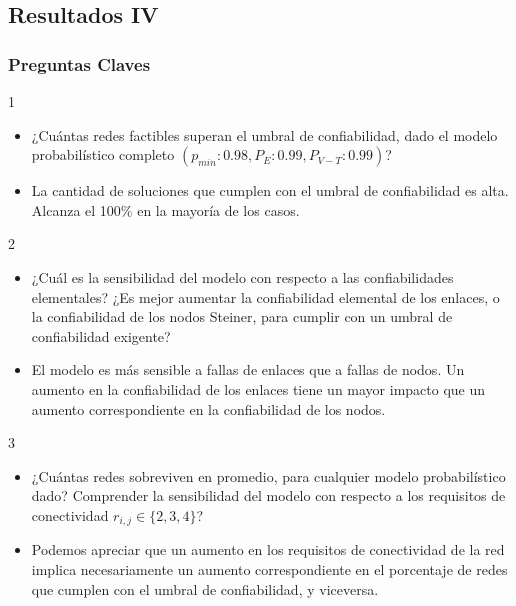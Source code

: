 \subsection{Resultados IV}
\begin{frame} \frametitle{Preguntas Claves}
\begin{tiny}
\begin{block} {1}
 	 \begin{itemize}
 	 	\item ¿Cuántas redes factibles superan el umbral de confiabilidad, dado el modelo probabilístico completo $(p_{min}:0.98,P_E:0.99,P_{V-T}:0.99)$?
 	 	\item La cantidad de soluciones que cumplen con el umbral de confiabilidad es alta. Alcanza el 100\% en la mayoría de los casos.
 	 \end{itemize}  
 \end{block} 	   
 \begin{block} {2}
 	 \begin{itemize}
 	 	\item ¿Cuál es la sensibilidad del modelo con respecto a las confiabilidades elementales? ¿Es mejor aumentar la confiabilidad elemental de los enlaces, o la confiabilidad de los nodos Steiner, para cumplir con un umbral de confiabilidad exigente?
 	 	\item El modelo es más sensible a fallas de enlaces que a fallas de nodos. Un aumento en la confiabilidad de los enlaces tiene un mayor impacto que un aumento correspondiente en la confiabilidad de los nodos.
 	 \end{itemize}  
 \end{block} 	
  \begin{block} {3}
 	 \begin{itemize}
 	 	\item ¿Cuántas redes sobreviven en promedio, para cualquier modelo probabilístico dado? Comprender la sensibilidad del modelo con respecto a los requisitos de conectividad $r_{i,j} \in \{2,3,4\}$?
 	 	\item Podemos apreciar que un aumento en los requisitos de conectividad de la red implica necesariamente un aumento correspondiente en el porcentaje de redes que cumplen con el umbral de confiabilidad, y viceversa.
 	 \end{itemize}  
 \end{block} 	
 \end{tiny}
\end{frame}

